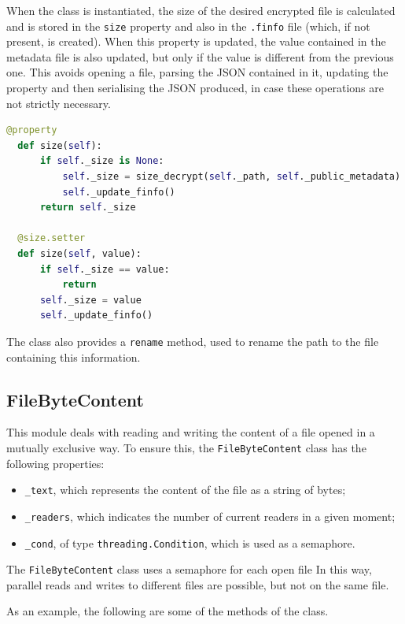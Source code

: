 \documentclass[a4paper,12pt,twoside,openright]{report}
\begin{document}
  When the class is instantiated, the size of the desired encrypted file is calculated and
  is stored in the \texttt{size} property and also in the \texttt{.finfo} file (which, if not present, is created).
  When this property is updated, the value contained in the metadata file is also updated,
  but only if the value is different from the previous one.
  This avoids opening a file, parsing the JSON contained in it, updating the property
  and then serialising the JSON produced, in case these operations are not strictly necessary.
  
  \clearpage
  \begin{lstlisting}[language=Python]
  @property
  def size(self):
      if self._size is None:
          self._size = size_decrypt(self._path, self._public_metadata)
          self._update_finfo()
      return self._size

  @size.setter
  def size(self, value):
      if self._size == value:
          return
      self._size = value
      self._update_finfo()
  \end{lstlisting}

  The class also provides a \texttt{rename} method, used to rename the path to the file containing this information.

  \subsection{FileByteContent}
  \label{section-filebytecontent}

  This module deals with reading and writing the content of a file opened in a mutually exclusive way.
  To ensure this, the \texttt{FileByteContent} class has the following properties:
  \begin{itemize}
    \item \texttt{\_text}, which represents the content of the file as a string of bytes;
    \item \texttt{\_readers}, which indicates the number of current readers in a given moment;
    \item \texttt{\_cond}, of type \texttt{threading.Condition}, which is used as a semaphore.    
  \end{itemize}

  The \texttt{FileByteContent} class uses a semaphore for each open file
  In this way, parallel reads and writes to different files are possible, but not on the same file.

  As an example, the following are some of the methods of the class.
  
\end{document}
